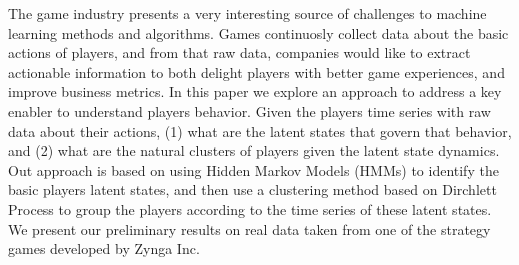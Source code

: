 The game industry presents a very interesting source of challenges to machine learning methods and algorithms.  Games continuosly collect data about the basic actions of players, and from that raw data, companies would like to extract actionable information to both delight players with better game experiences, and improve business metrics. In this paper we explore an approach to address a key enabler to understand players behavior. Given the players time series with raw data about  their  actions, (1) what are the latent states that govern that behavior, and (2) what are the natural clusters of players given the latent state dynamics.   Out approach is based on using Hidden Markov Models (HMMs) to identify the basic players latent states, and then use a clustering method based on Dirchlett Process to group the players according to the time series of these latent states. We present our preliminary results on real data taken from  one of the strategy games developed by Zynga Inc.\  



